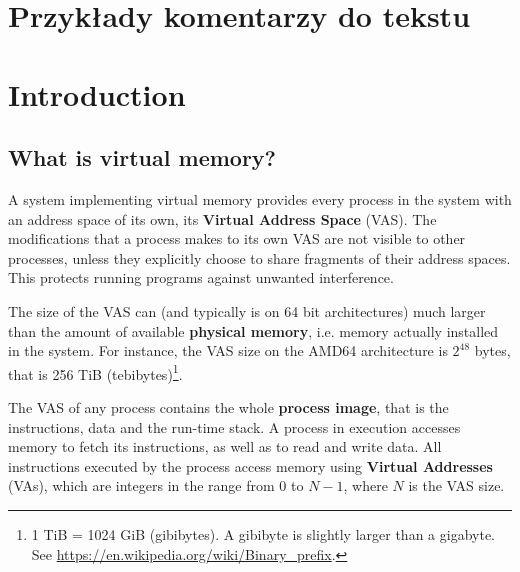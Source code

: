 \documentclass[shortabstract, english]{iithesis}
\author         {Jakub Piecuch}
\begin{document}


\chapter*{Przykłady komentarzy do tekstu}

 
 
 



\chapter{Introduction}


\section{What is virtual memory?}

A system implementing virtual memory provides every process in the system with
an address space of its own, its \textbf{Virtual Address Space} (VAS). The
modifications that a process makes to its own VAS are not visible to other
processes, unless they explicitly choose to share fragments of their address
spaces. This protects running programs against unwanted interference.

The size of the VAS can (and typically is on 64 bit architectures) much larger
than the amount of available \textbf{physical memory}, i.e. memory actually
installed in the system. For instance, the VAS size on the AMD64 architecture is
$2^{48}$ bytes, that is 256 TiB (tebibytes)\footnote{
  1 TiB = 1024 GiB (gibibytes). A gibibyte is slightly larger than a gigabyte. \\
  See \url{https://en.wikipedia.org/wiki/Binary_prefix}.}.

The VAS of any process contains the whole \textbf{process image}, that is the
instructions, data and the run-time stack. A process in execution accesses
memory to fetch its instructions, as well as to read and write data. All
instructions executed by the process access memory using \textbf{Virtual
  Addresses} (VAs), which are integers in the range from 0 to $N-1$, where $N$
is the VAS size.
\end{document}
